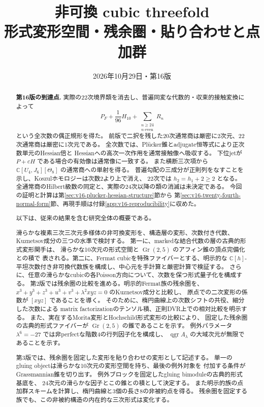 \documentclass[a4paper,11pt]{ltjsarticle}
\title{\bfseries 非可換 cubic threefold\\[0.35em]
\large 形式変形空間・残余圏・貼り合わせと点加群}
\author{}
\date{2026年10月29日・第16版}
\theoremstyle{definition}
\newcommand{\CC}{\mathbb C}
\newcommand{\Gr}{\operatorname{Gr}}
\newcommand{\qgr}{\operatorname{qgr}}
\begin{document}
\maketitle
\vspace{-1.5em}
\begin{abstract}
\noindent\textbf{第16版の到達点.}
実際の22次境界類を消去し、普遍同変な代数的・収束的接触変換によって
\[
 P_F+\frac1{96}H_{10}
       +\sum_{\substack{n\ge24\\n\ \mathrm{even}}}R_n
\]
という全次数の偶正規形を得た。
前版で二択を残した20次通常商は厳密に2次元、22次通常商は厳密に1次元である。
全次数では、Pl\"ucker錐とadjugate恒等式により正次数単元のHessian倍と
Hessianへの高次一次作用を通常接触像へ吸収する。
下位jetが $P+cH$ である場合の有効像は通常像に一致する。
また横断三次項から
$\mathbb C[U_4,J_6][\Theta_8]$ の通常商への単射を得る。
普遍勾配の三成分が正則列をなすことを示し、Koszulホモロジーは次数2より上で消え、
22次では $h_2=h_1+2\ge2$ となる。
全通常商のHilbert級数の同定と、実際の24次以降の類の消滅は未決定である。
今回の証明と計算は第\ref{sec:v16-plucker-hessian-structure}節から
第\ref{sec:v16-twenty-fourth-normal-form}節、再現手順は付録\ref{app:v16-reproducibility}に収めた。

以下は、従来の結果を含む研究全体の概要である。

滑らかな複素三次三次元多様体の非可換変形を、構造層の変形、次数付き代数、
Kuznetsov成分の三つの水準で検討する。
第一に、markedな結合代数の層の古典的形式変形関手は、
滑らかな10次元の形式空間と $\Gr(2,5)$ のアフィン錐の頂点完備化との積で
表される。第二に、Fermat cubicを特殊ファイバーとする、明示的な
$\CC[h]$-平坦次数付き非可換代数族を構成し、中心元を手計算と厳密計算で検証する。
さらに、任意の滑らかなcubicの各Poisson方向について、次数を保つ形式量子化を構成する。
第2版では残余圏の比較を進める。明示的Fermat族の残余圏を、
$x^3+y^3+z^3+u^3+v^3+\lambda^2xyz=0$ のKuznetsov成分と比較し、
原点での二次変形の係数が $[xyz]$ であることを導く。
そのために、楕円曲線上の次数シフトの共役、細分した次数による
matrix factorizationのテンソル積、正則DVR上での相対比較を明示する。
また、実在するMorita変形とHochschild形式変形の比較により、
固定した残余圏の古典的形式ファイバーが $\Gr(2,5)$ の錐であることを示す。
例外パラメータ $\lambda^6=-27$ では非perfectな階数4の行列因子化を構成し、
$\qgr A_\lambda$ の大域次元が無限であることを示す。

第3版では、残余圏を固定した変形を貼り合わせの変形として記述する。
単一のgluing objectは滑らかな10次元の変形空間を持ち、最後の例外対象を
付加する条件がGrassmannian錐を切り出す。
例外ブロックを固定したgluing bimoduleの古典的形式基底を、
24次元の滑らかな因子とこの錐との積として決定する。
また明示的族の点加群スキームを計算し、楕円曲線と3個の長さ8の非被約点を得る。
残余圏を固定する族でも、この非被約構造の内在的な三次形式は変化する。


\end{abstract}
\end{document}
